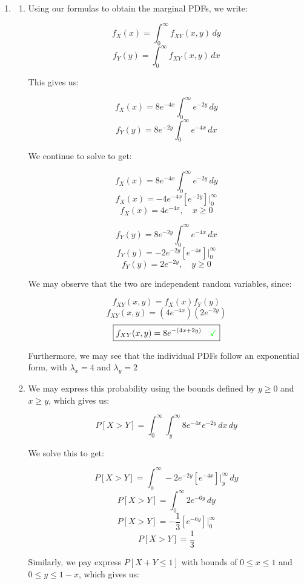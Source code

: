 \begin{enumerate}

  \item

    \begin{enumerate}

      \item Using our formulas to obtain the marginal PDFs, we write:

        $$f_X(x)=\int_{0}^{\infty} f_{XY}(x,y)\,dy$$
        $$f_Y(y)=\int_{0}^{\infty} f_{XY}(x,y)\,dx$$

        This gives us:

        $$f_X(x)=8e^{-4x}\int_{0}^{\infty} e^{-2y}\,dy$$
        $$f_Y(y)=8e^{-2y}\int_{0}^{\infty} e^{-4x}\,dx$$

        We continue to solve to get:

        $$f_X(x)=8e^{-4x}\int_{0}^{\infty} e^{-2y}\,dy$$
        $$f_X(x)=-4e^{-4x}\left[ e^{-2y} \right]\Big|_0^{\infty}$$
        $$\boxed{f_X(x)=4e^{-4x},\quad x\geq 0}$$

        $$f_Y(y)=8e^{-2y}\int_{0}^{\infty} e^{-4x}\,dx$$
        $$f_Y(y)=-2e^{-2y}\left[ e^{-4x} \right]\Big|_0^{\infty}$$
        $$\boxed{f_Y(y)=2e^{-2y},\quad y\geq0}$$

        We may observe that the two are independent random variables, since:

        $$f_{XY}(x,y)=f_X(x)f_Y(y)$$
        $$f_{XY}(x,y)=\left( 4e^{-4x} \right)\left( 2e^{-2y} \right)$$
        $$\boxed{f_{XY}(x,y)=8e^{-(4x+2y)}\quad \text{\textcolor{green}{\checkmark}}}$$

        Furthermore, we may see that the individual PDFs follow an exponential form, with $\boxed{\lambda_x=4}$ and $\boxed{\lambda_y=2}$

      \item We may express this probability using the bounds defined by $y\geq 0$ and $x\geq y$, which gives us:

        $$P[X>Y]=\int_0^{\infty}\int_y^{\infty} 8e^{-4x}e^{-2y}\,dx\,dy$$

        We solve this to get:

        $$P[X>Y]=\int_0^{\infty}-2e^{-2y}\left[ e^{-4x}\right]\Big|_y^{\infty}\,dy$$
        $$P[X>Y]=\int_0^{\infty}2e^{-6y}\,dy$$
        $$P[X>Y]=-\frac{1}{3}\left[e^{-6y}\right]\Big|_0^{\infty}$$
        $$\boxed{P[X>Y]=\frac{1}{3}}$$

        Similarly, we pay express $P[X+Y\leq 1]$ with bounds of $0\leq x\leq 1$ and $0\leq y\leq 1-x$, which gives us:


\end{enumerate}
\end{enumerate}
